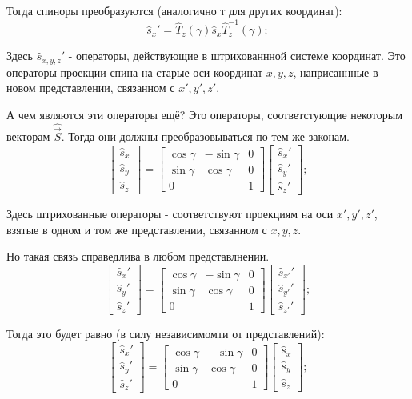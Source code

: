 \documentclass[a4paper, 14pt, russian]{article}
\newcommand{\be}{\begin{equation}}
\newcommand{\ee}{\end{equation}}
\begin{document}
	Тогда спиноры преобразуются (аналогично т для других координат):
	\be
		\hat{s}_x ' = \hat{T}_{z} (\gamma) \hat{s}_x \hat{T}_{z}^{-1} (\gamma);
	\ee

	Здесь $\hat{s}_{x,y,z}'$ - операторы, действующие в штрихованнной системе координат.
	Это операторы проекции спина на старые оси координат $x,y,z$, наприсаннные в новом 
	представлении, связанном с $x',y',z'$.
	
	А чем являются эти операторы ещё? Это операторы, соответстующие некоторым векторам $\hat{\vec S}$. 
	Тогда они должны преобразовываться по тем же законам.
	\be
		\begin{bmatrix} \hat{s}_x\\ \hat{s}_y \\ \hat{s}_z \end{bmatrix} = 
			\begin{bmatrix}
				\cos \gamma & - \sin \gamma	& 0\\
				\sin \gamma & \cos \gamma	& 0\\
				0			&				& 1
			\end{bmatrix} 
		\begin{bmatrix} \hat{s}_x'\\ \hat{s}_y' \\ \hat{s}_z' \end{bmatrix};
	\ee

	Здесь штрихованные операторы - соответствуют проекциям на оси $x',y',z'$,
	взятые в одном и том же представлении, связанном с $x,y,z$.

	Но такая связь справедлива в любом представлнении. 
	\be
		\begin{bmatrix} \hat{s}_x '\\ \hat{s}_y '\\ \hat{s}_z '\end{bmatrix} = 
			\begin{bmatrix}
				\cos \gamma & - \sin \gamma	& 0\\
				\sin \gamma & \cos \gamma	& 0\\
				0			&				& 1
			\end{bmatrix} 
		\begin{bmatrix} \hat{s}_{x'}'\\ \hat{s}_{y'}' \\ \hat{s}_{z'}' \end{bmatrix};
	\ee

	Тогда это будет равно (в силу независимомти от представлений):
	\be
		\begin{bmatrix} \hat{s}_x '\\ \hat{s}_y '\\ \hat{s}_z '\end{bmatrix} = 
			\begin{bmatrix}
				\cos \gamma & - \sin \gamma	& 0\\
				\sin \gamma & \cos \gamma	& 0\\
				0			&				& 1
			\end{bmatrix} 
		\begin{bmatrix} \hat{s}_{x}\\ \hat{s}_{y} \\ \hat{s}_{z} \end{bmatrix};
	\ee
\end{document}
